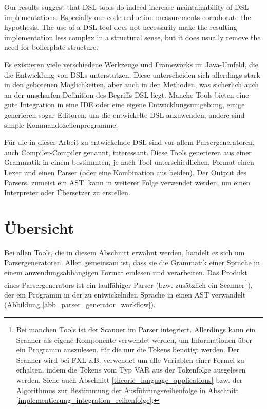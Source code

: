 \begin{myquote}
Our results suggest that DSL tools do indeed increase maintainability
of DSL implementations. Especially our code reduction measurements
corroborate the hypothesis. The use of a DSL tool does
not necessarily make the resulting implementation less complex in
a structural sense, but it does usually remove the need for boilerplate
structure. \cite{KlSt10}
\end{myquote}

Es existieren viele verschiedene Werkzeuge und Frameworks im  Java-Umfeld, die die Entwicklung von DSLs unterstützen. Diese unterscheiden sich allerdings stark in den gebotenen Möglichkeiten, aber auch in den Methoden, was sicherlich auch an der unscharfen Definition des Begriffs DSL liegt. Manche Tools bieten eine gute Integration in eine IDE oder eine eigene Entwicklungsumgebung, einige generieren sogar Editoren, um die entwickelte DSL anzuwenden, andere sind simple Kommandozeilenprogramme.

Für die in dieser Arbeit zu entwickelnde DSL sind vor allem Parsergeneratoren, auch Compiler-Compiler genannt, interessant. Diese Tools generieren aus einer Grammatik in einem bestimmten, je nach Tool unterschiedlichen, Format einen Lexer und einen Parser (oder eine Kombination aus beiden). Der Output des Parsers, zumeist ein AST, kann in weiterer Folge verwendet werden, um einen Interpreter oder Übersetzer zu erstellen.


\section{Über\-sicht}

Bei allen Tools, die in diesem Abschnitt erwähnt werden, handelt es sich um Parsergeneratoren. Allen gemeinsam ist, dass sie die Grammatik einer Sprache in einem anwendungsabhängigen Format einlesen und verarbeiten. Das Produkt eines Parsergenerators ist ein lauffähiger  Parser (bzw. zusätzlich ein Scanner\footnote{Bei manchen Tools ist der Scanner im Parser integriert. Allerdings kann ein Scanner als eigene Komponente verwendet werden, um Informationen über ein Programm auszulesen, für die nur die Tokens benötigt werden. Der Scanner wird bei FXL z.B. verwendet um alle Variablen einer Formel zu erhalten, indem die Tokens vom Typ VAR aus der Tokenfolge ausgelesen werden. Siehe auch Abschnitt \ref{theorie_language_applications} bzw. der Algorithmus zur Bestimmung der Aus\-führ\-ungsreihenfolge in Abschnitt \ref{implementierung_integration_reihenfolge}.}), der ein Programm in der zu entwickelnden Sprache in einen AST verwandelt (Abbildung \ref{abb_parser_generator_workflow}). 

